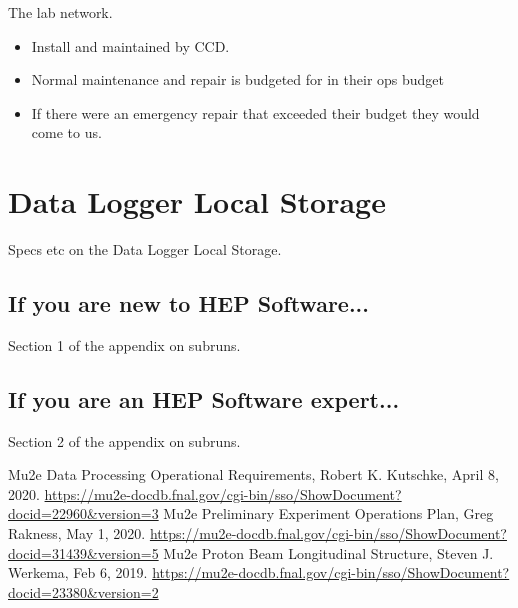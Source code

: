 The lab network.
\begin{itemize}
\item Install and maintained by CCD.
\item Normal maintenance and repair is budgeted for in their ops budget
\item If there were an emergency repair that exceeded their budget they would come to us. 
\end{itemize}

\chapter{Data Logger Local Storage}
\label{app:DataLoggerLocalStorage}

Specs etc on the Data Logger Local Storage.


\section{If you are new to HEP Software...}

Section 1 of the appendix on subruns.


\section{If you are an HEP Software expert...}

Section 2 of the appendix on subruns.


\clearpage
\begin{thebibliography}{Mu2e-doc-12345-v12}
Mu2e Data Processing Operational Requirements, Robert K. Kutschke, April 8, 2020.
   \href{https://mu2e-docdb.fnal.gov/cgi-bin/sso/ShowDocument?docid=22960\&version=3}{https://mu2e-docdb.fnal.gov/cgi-bin/sso/ShowDocument?docid=22960\&version=3}
Mu2e Preliminary Experiment Operations Plan, Greg Rakness, May 1, 2020.
  \href{https://mu2e-docdb.fnal.gov/cgi-bin/sso/ShowDocument?docid=31439\&version=5}{https://mu2e-docdb.fnal.gov/cgi-bin/sso/ShowDocument?docid=31439\&version=5}
 Mu2e Proton Beam Longitudinal Structure, Steven J. Werkema, Feb 6, 2019.
  \href{https://mu2e-docdb.fnal.gov/cgi-bin/sso/ShowDocument?docid=23380\&version=2}{https://mu2e-docdb.fnal.gov/cgi-bin/sso/ShowDocument?docid=23380\&version=2}
\end{thebibliography}



